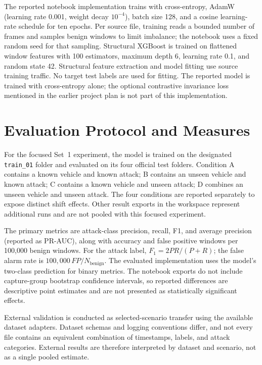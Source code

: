 \documentclass[12pt, a4paper, reqno, oneside]{book}
\begin{document}
The reported notebook implementation trains with cross-entropy, AdamW (learning rate 0.001, weight decay $10^{-4}$), batch size 128, and a cosine learning-rate schedule for ten epochs. Per source file, training reads a bounded number of frames and samples benign windows to limit imbalance; the notebook uses a fixed random seed for that sampling. Structural XGBoost is trained on flattened window features with 100 estimators, maximum depth 6, learning rate 0.1, and random state 42. Structural feature extraction and model fitting use source training traffic. No target test labels are used for fitting. The reported model is trained with cross-entropy alone; the optional contrastive invariance loss mentioned in the earlier project plan is not part of this implementation.

\section{Evaluation Protocol and Measures}
\label{sec:method_eval}
For the focused Set~1 experiment, the model is trained on the designated \texttt{train\_01} folder and evaluated on its four official test folders. Condition A contains a known vehicle and known attack; B contains an unseen vehicle and known attack; C contains a known vehicle and unseen attack; D combines an unseen vehicle and unseen attack. The four conditions are reported separately to expose distinct shift effects. Other result exports in the workspace represent additional runs and are not pooled with this focused experiment.

The primary metrics are attack-class precision, recall, F1, and average precision (reported as PR-AUC), along with accuracy and false positive windows per 100,000 benign windows. For the attack label, $F_1=2PR/(P+R)$; the false alarm rate is $100{,}000\,FP/N_{\mathrm{benign}}$. The evaluated implementation uses the model's two-class prediction for binary metrics. The notebook exports do not include capture-group bootstrap confidence intervals, so reported differences are descriptive point estimates and are not presented as statistically significant effects.

External validation is conducted as selected-scenario transfer using the available dataset adapters. Dataset schemas and logging conventions differ, and not every file contains an equivalent combination of timestamps, labels, and attack categories. External results are therefore interpreted by dataset and scenario, not as a single pooled estimate.
\end{document}
